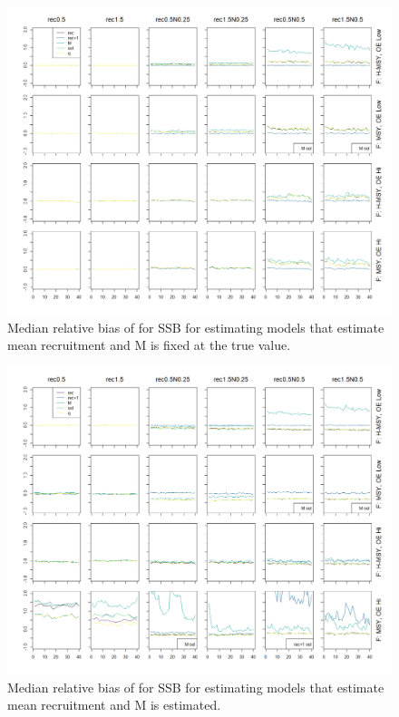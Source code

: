 \documentclass[
  12pt,
]{article}
\begin{document}
\begin{landscape}
\begin{figure}
\caption{Median relative bias of for SSB for estimating models that estimate mean recruitment and M is fixed at the true value.}\label{naa_om_em_R_MF_relbias_ssb}
\begin{center}
\includegraphics[width = \textwidth]{naa_om_R_MF_relbias_ssb.png}
\end{center}
\end{figure}
\end{landscape}

\begin{landscape}
\begin{figure}
\caption{Median relative bias of for SSB for estimating models that estimate mean recruitment and M is estimated.}\label{naa_om_em_R_ME_relbias_ssb}
\begin{center}
\includegraphics[width = \textwidth]{naa_om_R_ME_relbias_ssb.png}
\end{center}
\end{figure}
\end{landscape}
\end{document}
